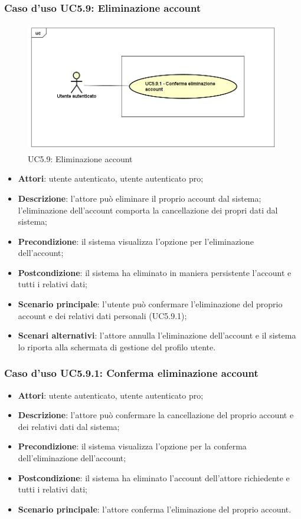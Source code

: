 \subsubsection{Caso d'uso UC5.9: Eliminazione account}
\label{UC5.9}
\begin{figure}[h]
	\centering
	\includegraphics[scale=0.5,keepaspectratio]{UML/UC5_9.png}
	\caption{UC5.9: Eliminazione account}
\end{figure}

\begin{itemize}
	\item \textbf{Attori}: utente autenticato, utente autenticato pro;
	\item \textbf{Descrizione}: l'attore può eliminare il proprio account dal sistema; l'eliminazione dell'account comporta la cancellazione dei propri dati dal sistema; 
	\item \textbf{Precondizione}: il sistema visualizza l'opzione per l'eliminazione dell'account;
	\item \textbf{Postcondizione}: il sistema ha eliminato in maniera persistente l'account e tutti i relativi dati;
	\item \textbf{Scenario principale}: l'utente può confermare l'eliminazione del proprio account e dei relativi dati personali (UC5.9.1);
	\item \textbf{Scenari alternativi}: l'attore annulla l'eliminazione dell'account e il sistema lo riporta alla schermata di gestione del profilo utente.
\end{itemize}

\subsubsection{Caso d'uso UC5.9.1: Conferma eliminazione account}

\begin{itemize}
	\item \textbf{Attori}: utente autenticato, utente autenticato pro;
	\item \textbf{Descrizione}: l'attore può confermare la cancellazione del proprio account e dei relativi dati dal sistema;
	\item \textbf{Precondizione}: il sistema visualizza l'opzione per la conferma dell'eliminazione dell'account;
	\item \textbf{Postcondizione}: il sistema ha eliminato l'account dell'attore richiedente e tutti i relativi dati;
	\item \textbf{Scenario principale}: l'attore conferma l'eliminazione del proprio account.
\end{itemize}